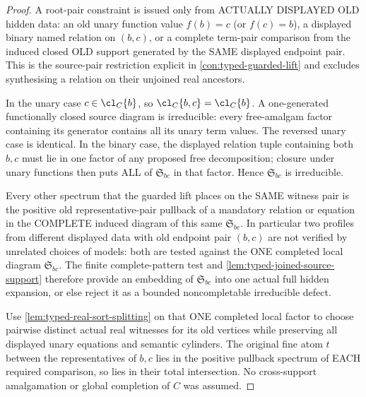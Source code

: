 \begin{proof}
A root-pair constraint is
issued only from ACTUALLY
DISPLAYED OLD hidden data:
an old unary function value
\(f(b)=c\) (or \(f(c)=b\)),
a displayed binary named
relation on \((b,c)\), or
a complete term-pair
comparison from the induced
closed OLD support generated
by the SAME displayed
endpoint pair. This is the
source-pair restriction
explicit in
\cref{con:typed-guarded-lift}
and excludes synthesising
a relation on their unjoined
real ancestors.

In the unary case
\(c\in\cl_C\{b\}\), so
\(\cl_C\{b,c\}=\cl_C\{b\}\).
A one-generated
functionally closed source
diagram is irreducible:
every free-amalgam factor
containing its generator
contains all its unary
term values. The reversed
unary case is identical.
In the binary case, the
displayed relation tuple
containing both \(b,c\)
must lie in one factor of
any proposed free
decomposition; closure
under unary functions then
puts ALL of \(\mathfrak S_{bc}\)
in that factor. Hence
\(\mathfrak S_{bc}\) is irreducible.

Every other spectrum that
the guarded lift places on
the SAME witness pair is
the positive old
representative-pair pullback
of a mandatory relation
or equation in the COMPLETE
induced diagram of this
same \(\mathfrak S_{bc}\). In
particular two profiles
from different displayed
data with old endpoint
pair \((b,c)\) are not
verified by unrelated
choices of models: both
are tested against the
ONE completed local
diagram \(\mathfrak S_{bc}\).
The finite complete-pattern
test and
\cref{lem:typed-joined-source-support}
therefore provide an
embedding of \(\mathfrak S_{bc}\)
into one actual full
hidden expansion, or
else reject it as a
bounded noncompletable
irreducible defect.

Use \cref{lem:typed-real-sort-splitting}
on that ONE completed
local factor to choose
pairwise distinct actual
real witnesses for its
old vertices while
preserving all displayed
unary equations and
semantic cylinders. The
original fine atom \(t\)
between the representatives
of \(b,c\) lies in the
positive pullback spectrum
of EACH required comparison,
so lies in their total
intersection. No
cross-support amalgamation
or global completion of
\(C\) was assumed.
\end{proof}

